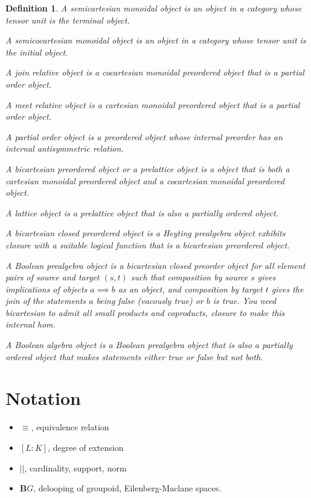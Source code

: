 \documentclass{tufte-book}
\newtheorem{definition}[theorem]{Definition}
\begin{document}
\begin{definition}
     A semicartesian monoidal object is an object in a category whose tensor unit is the terminal object.
 
     A semicocartesian monoidal object is an object in a category whose tensor unit is the initial object.
 
     A join relative object is a cocartesian monoidal preordered object that is a partial order object.
 
     A meet relative object is a cartesian monoidal preordered object that is a partial order object.
 
     A partial order object is a preordered object whose internal preorder has an internal antisymmetric relation.
 
     A bicartesian preordered object or a prelattice object is a object that is both a cartesian monoidal preordered object and a cocartesian monoidal preordered object.
 
     A lattice object is a prelattice object that is also a partially ordered object.
 
     A bicartesian closed preordered object is a Heyting prealgebra object exhibits closure with a suitable logical function that is a bicartesian preordered object.
 
     A Boolean prealgebra object is a bicartesian closed preorder object for all element pairs of source and target $(s,t)$ such that composition by source $s$ gives implications of objects $a \implies b$ as an object, and composition by target $t$ gives the join of the statements $a$ being false (vacously true) or $b$ is true. You need bicartesian to admit all small products and coproducts, closure to make this internal hom.
 
     A Boolean algebra object is a Boolean prealgebra object that is also a partially ordered object that makes statements either true or false but not both.
 \end{definition}

\chapter{Notation}

\begin{itemize}
  \item $\equiv$, equivalence relation
  \item $[L:K]$, degree of extension
  \item $||$, cardinality, support, norm
  \item $\mathbf{B}G$, delooping of groupoid, Eilenberg-Maclane spaces.
\end{itemize}

\backmatter




\printindex
\end{document}
